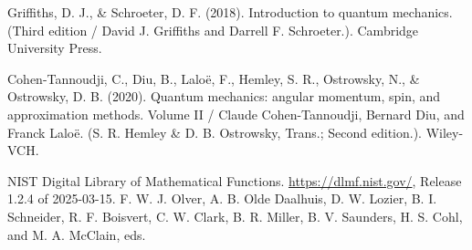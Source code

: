 \begin{thebibliography}{9}
Griffiths, D. J., \& Schroeter, D. F. (2018). Introduction to quantum mechanics. (Third edition / David J. Griffiths and Darrell F. Schroeter.). Cambridge University Press.

Cohen-Tannoudji, C., Diu, B., Laloë, F., Hemley, S. R., Ostrowsky, N., \& Ostrowsky, D. B. (2020). Quantum mechanics: angular momentum, spin, and approximation methods. Volume II / Claude Cohen-Tannoudji, Bernard Diu, and Franck Laloë. (S. R. Hemley \& D. B. Ostrowsky, Trans.; Second edition.). Wiley-VCH.

NIST Digital Library of Mathematical Functions. \url{https://dlmf.nist.gov/}, Release 1.2.4 of 2025-03-15. F. W. J. Olver, A. B. Olde Daalhuis, D. W. Lozier, B. I. Schneider, R. F. Boisvert, C. W. Clark, B. R. Miller, B. V. Saunders, H. S. Cohl, and M. A. McClain, eds.

\end{thebibliography}